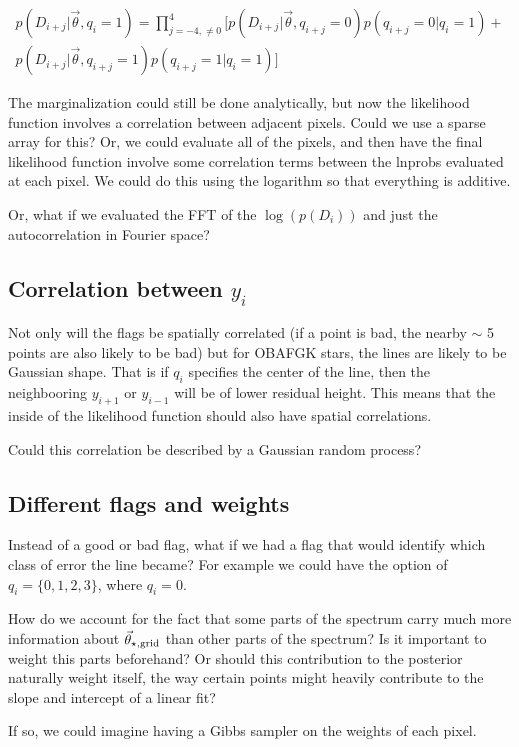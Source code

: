 \documentclass[preprint]{aastex} %
\newcommand{\vt}{\vec{\theta}}
\newcommand{\vg}{\vt_{\star, {\rm grid}}}
\begin{document}
\begin{multline}
  p(D_{i + j} | \vt, q_i = 1) = \prod_{j = -4, \ne 0}^4 \bigl [ p(D_{i+j} | \vt, q_{i +j}=0) p(q_{i+j} = 0 | q_i=1) + \\
    p(D_{i + j} | \vt, q_{i + j} = 1) p(q_{i +j} = 1 | q_i = 1) \bigr ]
\end{multline}

The marginalization could still be done analytically, but now the likelihood function involves a correlation between adjacent pixels. Could we use a sparse array for this? Or, we could evaluate all of the pixels, and then have the final likelihood function involve some correlation terms between the lnprobs evaluated at each pixel. We could do this using the logarithm so that everything is additive.

Or, what if we evaluated the FFT of the $\log(p(D_i))$ and just the autocorrelation in Fourier space?

\subsection{Correlation between $y_i$}
Not only will the flags be spatially correlated (if a point is bad, the nearby $\sim$ 5 points are also likely to be bad) but for OBAFGK stars, the lines are likely to be Gaussian shape. That is if $q_i$ specifies the center of the line, then the neighbooring $y_{i+1}$ or $y_{i-1}$ will be of lower residual height. This means that the inside of the likelihood function should also have spatial correlations.

Could this correlation be described by a Gaussian random process?

\subsection{Different flags and weights}
Instead of a good or bad flag, what if we had a flag that would identify which class of error the line became? For example we could have the option of $q_i = \{0, 1, 2, 3\}$, where $q_i=0$. 

How do we account for the fact that some parts of the spectrum carry much more information about $\vg$ than other parts of the spectrum? Is it important to weight this parts beforehand? Or should this contribution to the posterior naturally weight itself, the way certain points might heavily contribute to the slope and intercept of a linear fit?

If so, we could imagine having a Gibbs sampler on the weights of each pixel.
\end{document}
